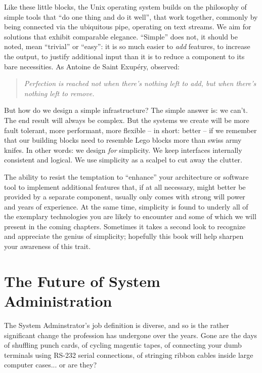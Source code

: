 Like these little blocks, the Unix operating system
builds on the philosophy of simple tools that ``do one
thing and do it well'', that work together, commonly
by being connected via the ubiquitous pipe,
operating on text
streams\cite{intro:mcilroy-unix-philosophy}.  We aim
for solutions that exhibit comparable elegance.
``Simple'' does not, it should be noted, mean
``trivial'' or ``easy'': it is so much easier to {\em
add} features, to increase the output, to justify
additional input than it is to reduce a component to
its bare necessities.  As Antoine de Saint
Exup\'{e}ry,
observed\cite{intro:exupery:terre-des-hommes}:

\begin{quote}
{\em Perfection is reached not when there's nothing left to
add, but when there's nothing left to remove.}
\end{quote}

But how do we design a simple infrastructure?  The
simple answer is: we can't.  The end result will
always be complex.  But the systems we create will be
more fault tolerant, more performant, more flexible
-- in short: better -- if we remember that our
building blocks need to resemble Lego blocks more than
swiss army knifes.  In other words: we design {\em
for} simplicity.  We keep interfaces internally
consistent and logical.  We use simplicity as a
scalpel to cut away the clutter.

The ability to resist the temptation to ``enhance''
your architecture or software tool to implement
additional features that, if at all necessary, might
better be provided by a separate component, usually
only comes with strong will power and years of
experience.  At the same time, simplicity is found to
underly all of the exemplary technologies you are
likely to encounter and some of which we will present
in the coming chapters.  Sometimes it takes a second
look to recognize and appreciate the genius of
simplicity; hopefully this book will help sharpen your
awareness of this trait.


\section{The Future of System Administration}
\label{introduction:future}

The System Adminstrator's job definition is diverse,
and so is the rather significant change the profession
has undergone over the years.  Gone are the days of
shuffling punch cards, of cycling magentic tapes, of
connecting your dumb terminals using RS-232 serial
connections, of stringing ribbon cables inside large
computer cases... or are they?

